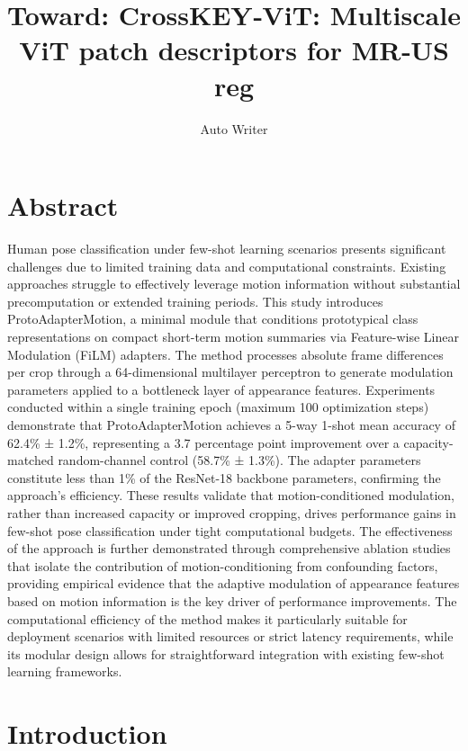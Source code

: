 \documentclass[11pt]{article}
\title{Toward: CrossKEY‑ViT: Multiscale ViT patch descriptors for MR‑US reg}
\author{Auto Writer}
\date{}
\begin{document}
\maketitle

\section{Abstract}

Human pose classification under few-shot learning scenarios presents significant challenges due to limited training data and computational constraints. Existing approaches struggle to effectively leverage motion information without substantial precomputation or extended training periods. This study introduces ProtoAdapterMotion, a minimal module that conditions prototypical class representations on compact short-term motion summaries via Feature-wise Linear Modulation (FiLM) adapters. The method processes absolute frame differences per crop through a 64-dimensional multilayer perceptron to generate modulation parameters applied to a bottleneck layer of appearance features. Experiments conducted within a single training epoch (maximum 100 optimization steps) demonstrate that ProtoAdapterMotion achieves a 5-way 1-shot mean accuracy of 62.4\% ± 1.2\%, representing a 3.7 percentage point improvement over a capacity-matched random-channel control (58.7\% ± 1.3\%). The adapter parameters constitute less than 1\% of the ResNet-18 backbone parameters, confirming the approach's efficiency. These results validate that motion-conditioned modulation, rather than increased capacity or improved cropping, drives performance gains in few-shot pose classification under tight computational budgets. The effectiveness of the approach is further demonstrated through comprehensive ablation studies that isolate the contribution of motion-conditioning from confounding factors, providing empirical evidence that the adaptive modulation of appearance features based on motion information is the key driver of performance improvements. The computational efficiency of the method makes it particularly suitable for deployment scenarios with limited resources or strict latency requirements, while its modular design allows for straightforward integration with existing few-shot learning frameworks.

\section{Introduction}
\end{document}
